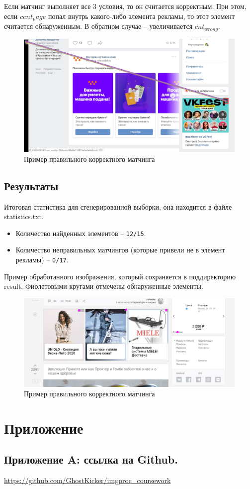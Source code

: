 \documentclass[a4paper,12pt,preview]{report} %
\begin{document}
	Если матчинг выполняет все 3 условия, то он считается корректным. При этом, если $cent_page$ попал внутрь какого-либо элемента рекламы, то этот элемент считается обнаруженным. В обратном случае -- увеличивается $cnt_{wrong}$.
	
	
	\begin{figure}[H]
		\centering\includegraphics[scale=0.5]{correct_matching.PNG}
		\caption{Пример правильного корректного матчинга}
		\label{fig:correct_matching}
	\end{figure}
	

\section{Результаты}

Итоговая статистика для сгенерированной выборки, она находится в файле statistics.txt.

\begin{itemize}
	\item Количество найденных элементов -- \texttt{12/15}.
	\item Количество неправильных матчингов (которые привели не в элемент рекламы) -- \texttt{0/17}.
\end{itemize}


Пример обработанного изображения, который сохраняется в поддиректорию result. Фиолетовыми кругами отмечены обнаруженные элементы.

	\begin{figure}[H]
		\centering\includegraphics[scale=0.5]{violet_balls.PNG}
		\caption{Пример правильного корректного матчинга}
		\label{fig:violet_balls}
	\end{figure}
	
	\chapter{Приложение}
	

\section{Приложение A: ссылка на Github.}

\url{https://github.com/GhostKicker/imgproc\_coursework}
	
\end{document}

